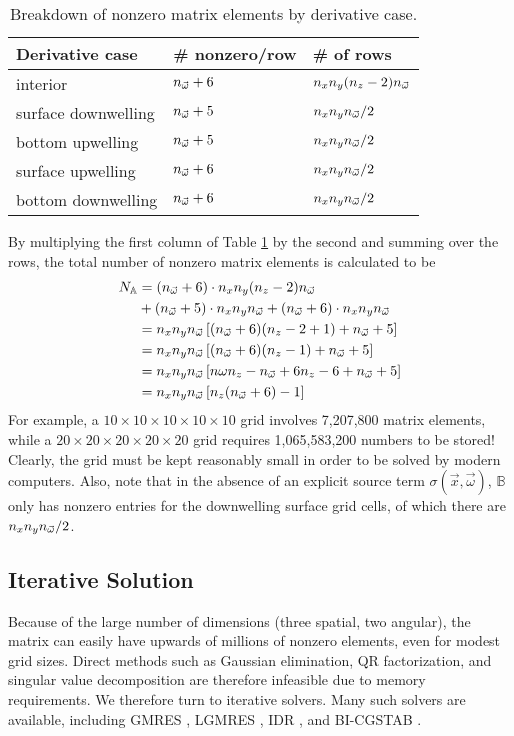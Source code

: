 \begin{table}[H]
  \centering
  \caption{Breakdown of nonzero matrix elements by derivative case.}
  \begin{tabular}{p{}p{}p{}}
    \toprule
    \textbf{Derivative case} & \textbf{\# nonzero/row} & \textbf{\# of rows} \\
    \midrule
    interior & ${n_{\vec{\omega}}}+6$ & $n_xn_y(n_z-2){n_{\vec{\omega}}}$ \\
    surface downwelling & ${n_{\vec{\omega}}}+5$ & $n_xn_y{n_{\vec{\omega}}}/2$ \\
    bottom upwelling & ${n_{\vec{\omega}}}+5$ & $n_xn_y{n_{\vec{\omega}}}/2$ \\
    surface upwelling & ${n_{\vec{\omega}}}+6$ & $n_xn_y{n_{\vec{\omega}}}/2$ \\
    bottom downwelling & ${n_{\vec{\omega}}}+6$ & $n_xn_y{n_{\vec{\omega}}}/2$ \\
    \bottomrule
  \end{tabular}
  \label{tab:nonzero}
\end{table}

By multiplying the first column of Table \ref{tab:nonzero} by the second and summing over the rows, the total number of nonzero matrix elements is calculated to be
\begin{align*}
  N_\mathbb{A} &= ({n_{\vec{\omega}}}+6) \cdot n_xn_y(n_z-2){n_{\vec{\omega}}} \\
    &+   ({n_{\vec{\omega}}}+5) \cdot n_xn_y{n_{\vec{\omega}}}
    +   ({n_{\vec{\omega}}}+6) \cdot n_xn_y{n_{\vec{\omega}}} \\
  &= n_x n_y {n_{\vec{\omega}}} \left[({n_{\vec{\omega}}}+6)(n_z-2+1)+{n_{\vec{\omega}}}+5 \right] \\
  &= n_x n_y {n_{\vec{\omega}}} \left[({n_{\vec{\omega}}}+6)(n_z-1)+{n_{\vec{\omega}}}+5 \right] \\
  &=  n_x n_y {n_{\vec{\omega}}} \left[n\omega n_z -{n_{\vec{\omega}}} + 6n_z - 6 + {n_{\vec{\omega}}} + 5 \right] \\
  &=  n_x n_y {n_{\vec{\omega}}} \left[n_z({n_{\vec{\omega}}}+6)-1\right]
\end{align*}
For example, a $10 \times 10 \times 10 \times 10 \times 10$ grid involves 7,207,800 matrix elements, while a $20 \times 20 \times 20 \times 20 \times 20$ grid requires 1,065,583,200 numbers to be stored!
Clearly, the grid must be kept reasonably small in order to be solved by modern computers.
Also, note that in the absence of an explicit source term $\sigma(\vec{x}, \vec{\omega})$, $\mathbb{B}$ only has nonzero entries for the downwelling surface grid cells, of which there are $n_x n_y {n_{\vec{\omega}}}/2$.

\subsection{Iterative Solution}
Because of the large number of dimensions (three spatial, two angular), the matrix can easily have upwards of millions of nonzero elements,
even for modest grid sizes.
Direct methods such as Gaussian elimination, QR factorization, and singular value decomposition are therefore infeasible due to memory requirements.
We therefore turn to iterative solvers.
Many such solvers are available, including GMRES \cite{saad_gmres:_1985}, LGMRES \cite{baker_technique_2005}, IDR \cite{sonneveld_idrs:_2008}, and BI-CGSTAB \cite{van_der_vorst_bi-cgstab:_1992}.

